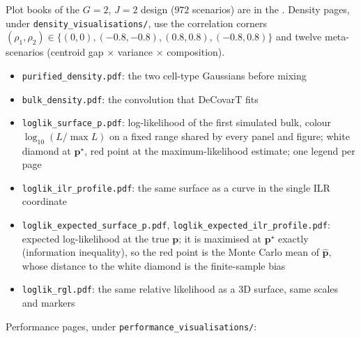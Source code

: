 Plot books of the \(G=2\), \(J=2\) design (\(972\) scenarios) are in the
.
Density pages, under \texttt{density\_visualisations/}, use the correlation corners
\((\rho_{1},\rho_{2})\in\{(0,0),(-0.8,-0.8),(0.8,0.8),(-0.8,0.8)\}\) and twelve meta-scenarios
(centroid gap \(\times\) variance \(\times\) composition).

\begin{itemize}
  \item \texttt{purified\_density.pdf}: the two cell-type Gaussians before mixing
  \item \texttt{bulk\_density.pdf}: the convolution that DeCovarT fits
  \item \texttt{loglik\_surface\_p.pdf}: log-likelihood of the first simulated bulk, colour \(\log_{10}(L/\max L)\) on a
        fixed range shared by every panel and figure; white diamond at \(\boldsymbol{p}^{\star}\), red point at the
        maximum-likelihood estimate; one legend per page
  \item \texttt{loglik\_ilr\_profile.pdf}: the same surface as a curve in the single ILR coordinate
  \item \texttt{loglik\_expected\_surface\_p.pdf}, \texttt{loglik\_expected\_ilr\_profile.pdf}: expected
        log-likelihood at the true \(\boldsymbol{p}\); it is maximised at \(\boldsymbol{p}^{\star}\) exactly (information
        inequality), so the red point is the Monte Carlo mean of \(\hat{\boldsymbol{p}}\), whose distance to the white
        diamond is the finite-sample bias
  \item \texttt{loglik\_rgl.pdf}: the same relative likelihood as a 3D surface, same scales and markers
\end{itemize}

Performance pages, under \texttt{performance\_visualisations/}:

